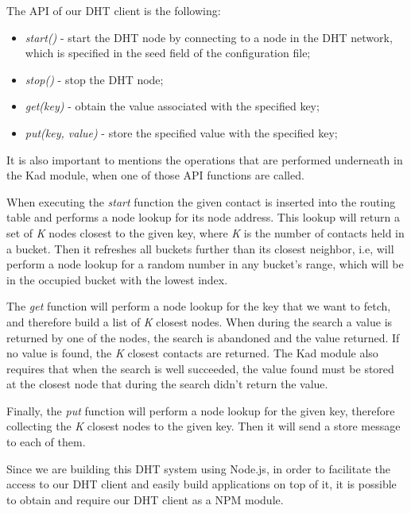 

The \ac{API} of our DHT client is the following:

\begin{itemize}
  \item \textit{start()} - start the DHT node by connecting to a node in the DHT network, which is specified in the seed field of the configuration file;
  \item \textit{stop()} - stop the DHT node;
  \item \textit{get(key)} - obtain the value associated with the specified key;
  \item \textit{put(key, value)} - store the specified value with the specified key;
\end{itemize}

It is also important to mentions the operations that are performed underneath in the Kad module, when one of those API functions are called.

When executing the \textit{start} function the given contact is inserted into the routing table and performs a node lookup for its node address.
This lookup will return a set of \textit{K} nodes closest to the given key, where \textit{K} is the number of contacts held in a bucket.
Then it refreshes all buckets further than its closest neighbor, i.e, will perform a node lookup for a random number in any bucket's range, which will be in the occupied bucket with the lowest index.

The \textit{get} function will perform a node lookup for the key that we want to fetch, and therefore build a list of \textit{K} closest nodes.
When during the search a value is returned by one of the nodes, the search is abandoned and the value returned.
If no value is found,  the \textit{K} closest contacts are returned.
The Kad module also requires that when the search is well succeeded, the value found must be stored at the closest node that during the search didn't return the value.

Finally, the \textit{put} function will perform a node lookup for the given key, therefore collecting the \textit{K} closest nodes to the given key.
Then it will send a store message to each of them.

Since we are building this DHT system using Node.js, in order to facilitate the access to our DHT client and easily build applications on top of it, it is possible to obtain and require our DHT client as a \ac{NPM} module.

